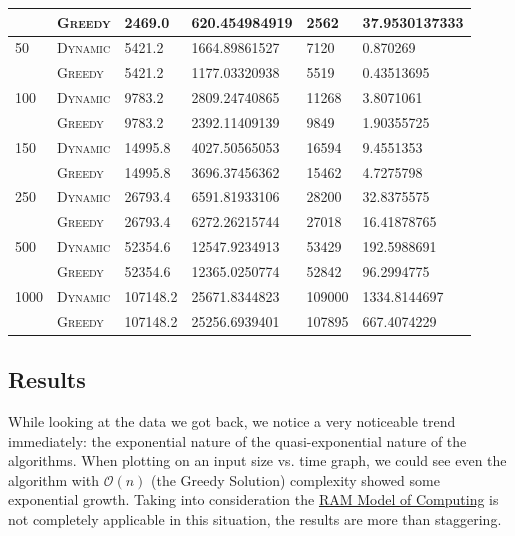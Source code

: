 \documentclass{article}
\begin{document}
\begin{adjustwidth}{-.5cm}{}
\begin{center}
\begin{tabular}{l|lllll}
        & \textsc{Greedy}  & 2469.0    & 620.454984919    & 2562     &  37.9530137333        \\ \midrule
50      & \textsc{Dynamic} & 5421.2    & 1664.89861527    & 7120     &  0.870269             \\
        & \textsc{Greedy}  & 5421.2    & 1177.03320938    & 5519     &  0.43513695           \\ \midrule
100     & \textsc{Dynamic} & 9783.2    & 2809.24740865    & 11268    &  3.8071061            \\
        & \textsc{Greedy}  & 9783.2    & 2392.11409139    & 9849     &  1.90355725           \\ \midrule
150     & \textsc{Dynamic} & 14995.8   & 4027.50565053    & 16594    &  9.4551353            \\
        & \textsc{Greedy}  & 14995.8   & 3696.37456362    & 15462    &  4.7275798            \\ \midrule
250     & \textsc{Dynamic} & 26793.4   & 6591.81933106    & 28200    &  32.8375575           \\
        & \textsc{Greedy}  & 26793.4   & 6272.26215744    & 27018    &  16.41878765          \\ \midrule
500     & \textsc{Dynamic} & 52354.6   & 12547.9234913    & 53429    &  192.5988691          \\
        & \textsc{Greedy}  & 52354.6   & 12365.0250774    & 52842    &  96.2994775           \\ \midrule
1000    & \textsc{Dynamic} & 107148.2  & 25671.8344823    & 109000   &  1334.8144697         \\
        & \textsc{Greedy}  & 107148.2  & 25256.6939401    & 107895   &  667.4074229          \\
        \bottomrule
        \end{tabular}
    \end{center}
\end{adjustwidth}


\subsection{Results}
While looking at the data we got back, we notice a very noticeable trend immediately: the exponential nature of the quasi-exponential nature of the algorithms. When plotting on an input size vs. time graph, we could see even the algorithm with $\mathcal{O}(n)$  (the Greedy Solution) complexity showed some exponential growth. Taking into consideration the \href{https://en.wikipedia.org/wiki/Model_of_computation}{RAM Model of Computing} is not completely applicable in this situation, the results are more than staggering.
\end{document}
